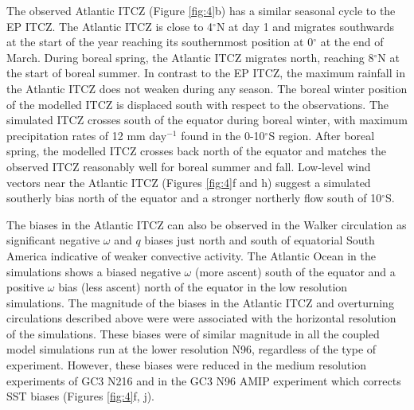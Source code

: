 The observed Atlantic ITCZ (Figure \ref{fig:4}b) has a similar seasonal cycle to the EP ITCZ.
The Atlantic ITCZ is close to 4$^\circ$N at day 1 and migrates southwards at the start of the year reaching  its southernmost position at 0$^\circ$ at the end of March.
During boreal spring, the Atlantic ITCZ migrates north, reaching 8$^\circ$N at the start of boreal summer. In contrast to the EP ITCZ, the maximum rainfall in the Atlantic ITCZ does not weaken during any season. 
The boreal winter position of the modelled ITCZ is displaced south with respect to the observations.
The simulated ITCZ  crosses south of the equator during boreal winter, with maximum precipitation rates of 12 mm day$^{-1}$ found in the 0-10$^\circ$S region.
After boreal spring, the modelled ITCZ crosses back north of the equator and matches the observed ITCZ reasonably well for boreal summer and fall.
Low-level wind vectors near the Atlantic ITCZ (Figures \ref{fig:4}f and h) suggest a simulated southerly bias north of the equator and a stronger northerly flow south of 10$^\circ$S.

The biases in the Atlantic ITCZ can also be observed in the Walker circulation as significant negative $\omega$ and $q$ biases just north and south of equatorial South America indicative of weaker convective activity. The Atlantic Ocean in the simulations shows a biased negative $\omega$ (more ascent) south of the equator and a positive $\omega$ bias (less ascent) north of the equator in the low resolution simulations.
The magnitude of the biases in the Atlantic ITCZ and overturning circulations described above were were associated with the horizontal resolution of the simulations. These biases were of similar magnitude in all the coupled model simulations run at the lower resolution N96, regardless of the type of experiment. However, these biases were reduced in the medium resolution experiments of GC3 N216 and in the GC3 N96 AMIP experiment which corrects SST biases (Figures \ref{fig:4}f, j). 

